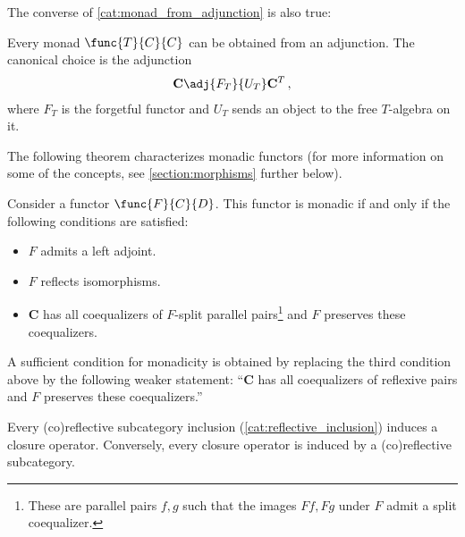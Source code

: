     The converse of \ref{cat:monad_from_adjunction} is also true:
    \begin{property}
        Every monad $\func{T}{C}{C}$ can be obtained from an adjunction. The canonical choice is the adjunction
        \begin{gather}
            \mathbf{C}\adj{F_T}{U_T}\mathbf{C}^T\,,
        \end{gather}
        where $F_T$ is the forgetful functor and $U_T$ sends an object to the free $T$-algebra on it.
    \end{property}

    The following theorem characterizes monadic functors (for more information on some of the concepts, see \cref{section:morphisms} further below).
    \begin{theorem}
        Consider a functor $\func{F}{C}{D}$. This functor is monadic if and only if the following conditions are satisfied:
        \begin{itemize}
            \item $F$ admits a left adjoint.
            \item $F$ reflects isomorphisms.
            \item $\mathbf{C}$ has all coequalizers of $F$-split parallel pairs\footnote{These are parallel pairs $f,g$ such that the images $Ff,Fg$ under $F$ admit a split coequalizer.} and $F$ preserves these coequalizers.
        \end{itemize}
    \end{theorem}
    \begin{remark}
        A sufficient condition for monadicity is obtained by replacing the third condition above by the following weaker statement: ``$\mathbf{C}$ has all coequalizers of reflexive pairs and $F$ preserves these coequalizers.''
    \end{remark}

    \begin{property}
        Every (co)reflective subcategory inclusion (\cref{cat:reflective_inclusion}) induces a closure operator. Conversely, every closure operator is induced by a (co)reflective subcategory.
    \end{property}

